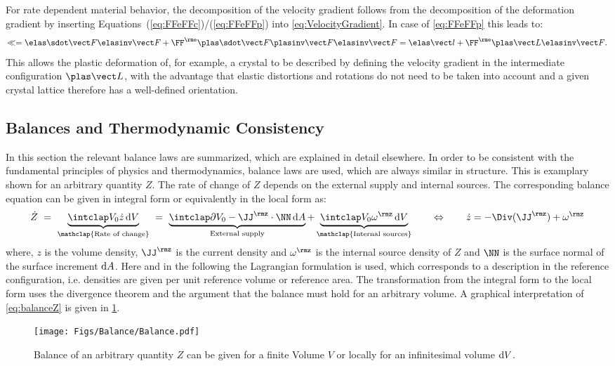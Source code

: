For rate dependent material behavior, the decomposition of the velocity gradient follows from the decomposition of the deformation gradient by inserting Equations~(\ref{eq:FFeFFc})/(\ref{eq:FFeFFp}) into \cref{eq:VelocityGradient}. In case of \cref{eq:FFeFFp} this leads to:
\begin{align}
  \ll = \FFedot\FFeinv + \FFe \FFpdot \FFpinv \FFeinv = \lle + \FFe\LLp\FFeinv.
  \label{eq:DecompositionLL}
\end{align}
This allows the plastic deformation of, for example, a crystal to be described by defining the velocity gradient in the intermediate configuration $\LLp$, with the advantage that elastic distortions and rotations do not need to be taken into account and a given crystal lattice therefore has a well-defined orientation.

\subsection{Balances and Thermodynamic Consistency}
In this section the relevant balance laws are summarized, which are explained in detail elsewhere\supercite{hertel_continuum_2012}. In order to be consistent with the fundamental principles of physics and thermodynamics, balance laws are used, which are always similar in structure. This is examplary shown for an arbitrary quantity $Z$. The rate of change of $Z$ depends on the external supply and internal sources. The corresponding balance equation can be given in integral form or equivalently in the local form as:
\begin{align}
  \dot Z  \ = \ \underbrace{ \intVO \dot z \dV}_{\mathclap{\text{Rate of change}}} \ = \ \underbrace{\intdVO -\JJ^{\rmz} \cdot \NN\dA}_{\text{External supply}} + \underbrace{\intVO \omega^{\rmz} \dV}_{\mathclap{\text{Internal sources}}} 
  \qquad \Leftrightarrow \qquad \dot z = -\Div(\JJ^{\rmz}) + \omega^{\rmz}
  \label{eq:balanceZ}
\end{align} 
where, $z$ is the volume density, $\JJ^\rmz$ is the current density and $\omega^\rmz$ is the internal source density of $Z$ and $\NN$ is the surface normal of the surface increment ${\rm d} A$. Here and in the following the Lagrangian formulation is used, which corresponds to a description in the reference configuration, i.e. densities are given per unit reference volume or reference area. The transformation from the integral form to the local form uses the divergence theorem and the argument that the balance must hold for an arbitrary volume. A graphical interpretation of \cref{eq:balanceZ} is given in \cref{fig:Balance}.
\begin{figure}[h!]
  \centering
  \texttt{[image: Figs/Balance/Balance.pdf]}
  \caption[]{Balance of an arbitrary quantity $Z$ can be given for a finite Volume $V$ or locally for an infinitesimal volume ${\rm d} V$.}
  \label{fig:Balance}
\end{figure}

